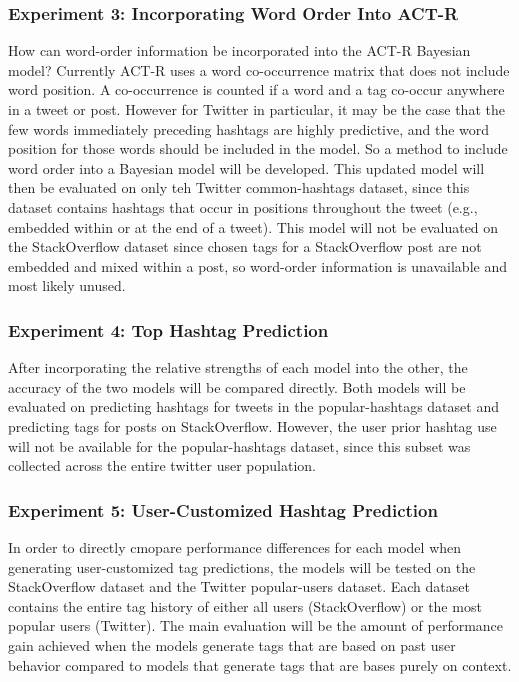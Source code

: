 \documentclass[man,floatsintext]{apa6}
\begin{document}
\subsubsection{Experiment 3: Incorporating Word Order Into ACT-R}

How can word-order information be incorporated into the ACT-R Bayesian model?
Currently ACT-R uses a word co-occurrence matrix that does not include word position.
A co-occurrence is counted if a word and a tag co-occur anywhere in a tweet or post.
However for Twitter in particular, it may be the case that the few words immediately preceding hashtags are highly predictive, and the word position for those words should be included in the model.
So a method to include word order into a Bayesian model will be developed.
This updated model will then be evaluated on only teh Twitter common-hashtags dataset, since this dataset contains hashtags that occur in positions throughout the tweet (e.g., embedded within or at the end of a tweet).
This model will not be evaluated on the StackOverflow dataset since chosen tags for a StackOverflow post are not embedded and mixed within a post, so word-order information is unavailable and most likely unused.

\subsubsection{Experiment 4: Top Hashtag Prediction}

After incorporating the relative strengths of each model into the other, the accuracy of the two models will be compared directly.
Both models will be evaluated on predicting hashtags for tweets in the popular-hashtags dataset and predicting tags for posts on StackOverflow.
However, the user prior hashtag use will not be available for the popular-hashtags dataset, since this subset was collected across the entire twitter user population.

\subsubsection{Experiment 5: User-Customized Hashtag Prediction}

In order to directly cmopare performance differences for each model when generating user-customized tag predictions, the models will be tested on the StackOverflow dataset and the Twitter popular-users dataset.
Each dataset contains the entire tag history of either all users (StackOverflow) or the most popular users (Twitter).
The main evaluation will be the amount of performance gain achieved when the models generate tags that are based on past user behavior compared to models that generate tags that are bases purely on context.
\end{document}

